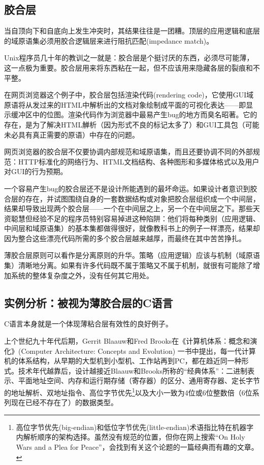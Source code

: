 \documentclass[12pt,oneside]{book}
\begin{document}
\begin{common-format}
\subsection{胶合层}
当自顶向下和自底向上发生冲突时，其结果往往是一团糟。顶层的应用逻辑和底层的域原语集必须用胶合逻辑层来进行阻抗匹配(impedance match)。

Unix程序员几十年的教训之一就是：胶合层是个挺讨厌的东西，必须尽可能薄，这一点极为重要。胶合层用来将东西粘在一起，但不应该用来隐藏各层的裂痕和不平整。

在网页浏览器这个例子中，胶合层包括渲染代码(rendering code)，它使用GUI域原语将从发过来的HTML中解析出的文档对象绘制成平面的可视化表达——即显示缓冲区中的位图。渲染代码作为浏览器中最易产生bug的地方而臭名昭著。它的存在，是为了解决HTML觯析（因为形式不良的标记太多了）和GUI工具包（可能未必具有真正需要的原语）中存在的问题。

网页浏览器的胶合层不仅要协调内部规范和域原语集，而且还要协调不同的外部规范：HTTP标准化的网络行为、HTML文档结构、各种图形和多媒体格式以及用户对GUI的行为预期。

一个容易产生bug的胶合层还不是设计所能遇到的最坏命运。如果设计者意识到胶合层的存在，并试图围绕自身的一套数据结构或对象把胶合层组织成一个中间层，结果却导致出现两个胶合层——一个在中间层之上，另一个在中间层之下。那些天资聪慧但经验不足的程序员特别容易掉进这种陷阱：他们将每种类别（应用逻辑、中间层和域原语集）的基本集都做得很好，就像教科书上的例子一样漂亮，结果却因为整合这些漂亮代码所需的多个胶合层越来越厚，而最终在其中苦苦挣扎。

薄胶合层原则可以看作是分离原则的升华。策略（应用逻辑）应该与机制（域原语集）清晰地分离。如果有许多代码既不属于策略又不属于机制，就很有可能除了增加系统的整体复杂度之外，没有任何其它用处。


\subsection{实例分析：被视为薄胶合层的C语言}
C语言本身就是一个体现薄粘合层有效性的良好例子。

上个世纪九十年代后期，Gerrit Blaauw和Fred Brooks在《计算机体系：概念和演化》(Computer Architecture:  Concepts and Evolution)  \cite{BlaauwBrooks}一书中提出，每一代计算机的体系结构，从早期的大型机到小型机、工作站再到PC，都在趋近同一种形式。技术年代越靠后，设计越接近Blaauw和Brooks所称的“经典体系”：二进制表示、平面地址空间、内存和运行期存储（寄存器）的区分、通用寄存器、定长字节的地址解析、双地址指令、高位字节优先\footnote{高位字节优先(big-endian)和低位字节优先(little-endian)术语指比特在机器字内解析顺序的架构选择。虽然没有规范的位置，但你在网上搜索“On Holy Wars and a Plea for Peace”，会找到有关这个论题的一篇经典而有趣的文章。}以及大小一致为4位或6位整数倍（6位系列现在已经不存在了）的数据类型。


\end{common-format}
\end{document}

